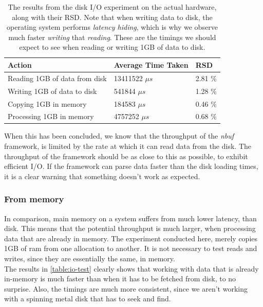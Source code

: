 \documentclass[a4paper]{article}
\newcommand{\nbuf}{\textit{nbuf} }
\begin{document}
\begin{table}[]
\begin{adjustwidth}{-0.5in}{-0.5in}
\centering
\begin{tabular}{@{}lll@{}}
\toprule
\textbf{Action}                & \textbf{Average Time Taken} & \textbf{RSD} \\ \midrule
Reading 1GB of data from disk  & 13411522 $\mu s$            & 2.81 \%      \\ \midrule
Writing 1GB of data to disk    & 541844   $\mu s$            & 1.28 \%      \\ \midrule
Copying 1GB in memory          & 184583   $\mu s$            & 0.46 \%      \\ \midrule
Processing 1GB in memory       & 4757252  $\mu s$            & 0.68 \%      \\ \bottomrule
\end{tabular}

\caption{The results from the disk I/O experiment on the actual hardware, along with their RSD. Note that when writing data to disk, the operating system performs \textit{latency hiding}, which is why we observe much faster \textit{writing} that \textit{reading}. These are the timings we should expect to see when reading or writing 1GB of data to disk.}
\label{table:io-test}
\end{adjustwidth}
\end{table}


When this has been concluded, we know that the throughput of the \nbuf framework, is limited by the rate at which it can read data from the disk. The throughput of the framework should be as close to this as possible, to exhibit efficient I/O. If the framework can parse data faster than the disk loading times, it is a clear warning that something doesn't work as expected.


\subsubsection{From memory}
In comparison, main memory on a system suffers from much lower latency, than disk. This means that the potential throughput is much larger, when processing data that are already in memory. The experiment conducted here, merely copies 1GB of ram from one allocation to another. It is not necessary to test reads and writes, since they are essentially the same, in memory.\\

The results in \autoref{table:io-test} clearly shows that working with data that is already in-memory is much faster than when it has to be fetched from disk, to no surprise. Also, the timings are much more consistent, since we aren't working with a spinning metal disk that has to seek and find.\\
\end{document}
